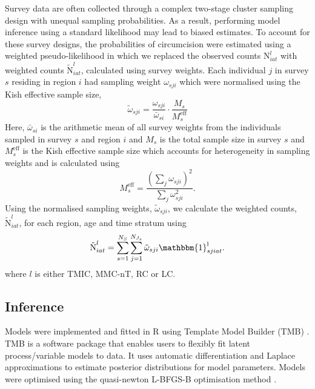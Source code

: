 \documentclass{article}
\begin{document}
\begin{appendix}
\noindent Survey data are often collected through a complex two-stage cluster sampling design with unequal sampling probabilities. As a result, performing model inference using a standard likelihood may lead to biased estimates. To account for these survey designs, the probabilities of circumcision were estimated using a weighted pseudo-likelihood in which we replaced the observed counts $\text{N}^l_{iat}$ with weighted counts $\tilde{\text{N}}^l_{iat}$, calculated using survey weights. Each individual $j$ in survey $s$ residing in region $i$ had sampling weight $\omega_{sji}$ which were normalised using the Kish effective sample size, 
\begin{equation*}
	\tilde\omega_{sji} = \frac{\omega_{sji}}{\bar{\omega}_{si}}\cdot \frac{M_s}{M^{\text{eff}}_s} 
\end{equation*}
Here, $\bar{\omega}_{si}$ is the arithmetic mean of all survey weights from the individuals sampled in survey $s$ and region $i$ and $M_s$ is the total sample size in survey $s$ and $M^{\text{eff}}_s$ is the Kish effective sample size which accounts for heterogeneity in sampling weights and is calculated using 
\begin{equation*}
	M^{\text{eff}}_s = \frac{(\sum_j \omega_{sji})^2}{\sum_j \omega_{sji}^{2}}.
\end{equation*}
Using the normalised sampling weights, $\tilde\omega_{sji}$, we calculate the weighted counts, $\tilde{\text{N}}^l_{iat}$, for each region, age and time stratum using 
\begin{equation*}
	\tilde{\text{N}}^{l}_{iat} = \sum_{s=1}^{N_S}\sum_{j=1}^{N_{J_s}}\tilde\omega_{sji} \mathbbm{1}^{\text{l}}_{sjiat}.
\end{equation*}
where $l$ is either TMIC, MMC-nT, RC or LC. 


\subsection{Inference}


\noindent Models were implemented and fitted in R \cite{rcore} using Template Model Builder (TMB) \cite{kristensen2016tmb}. TMB is a software package that enables users to flexibly fit latent process/variable models to data. It uses automatic differentiation and Laplace approximations to estimate posterior distributions for model parameters. Models were optimised using the quasi-newton L-BFGS-B optimisation method \cite{byrd1995limited}.\\


\end{appendix}
\end{document}
